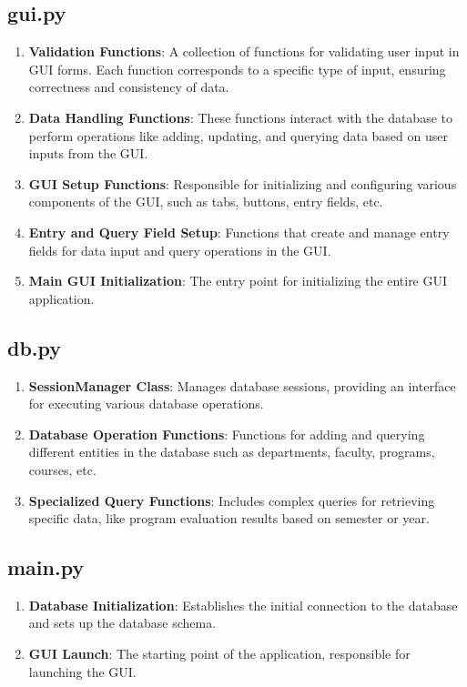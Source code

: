 \documentclass{article}
\begin{document}
			\subsection*{gui.py}
			\begin{enumerate}
			    \item \textbf{Validation Functions}: A collection of functions for validating user input in GUI forms. Each function corresponds to a specific type of input, ensuring correctness and consistency of data.
			    \item \textbf{Data Handling Functions}: These functions interact with the database to perform operations like adding, updating, and querying data based on user inputs from the GUI.
			    \item \textbf{GUI Setup Functions}: Responsible for initializing and configuring various components of the GUI, such as tabs, buttons, entry fields, etc.
			    \item \textbf{Entry and Query Field Setup}: Functions that create and manage entry fields for data input and query operations in the GUI.
			    \item \textbf{Main GUI Initialization}: The entry point for initializing the entire GUI application.
			\end{enumerate}

			\subsection*{db.py}
			\begin{enumerate}
			    \item \textbf{SessionManager Class}: Manages database sessions, providing an interface for executing various database operations.
			    \item \textbf{Database Operation Functions}: Functions for adding and querying different entities in the database such as departments, faculty, programs, courses, etc.
			    \item \textbf{Specialized Query Functions}: Includes complex queries for retrieving specific data, like program evaluation results based on semester or year.
			\end{enumerate}

			\subsection*{main.py}
			\begin{enumerate}
			    \item \textbf{Database Initialization}: Establishes the initial connection to the database and sets up the database schema.
			    \item \textbf{GUI Launch}: The starting point of the application, responsible for launching the GUI.
			\end{enumerate}
\end{document}
